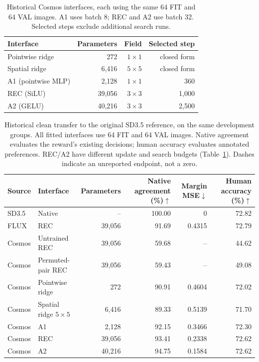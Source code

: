 \documentclass[10pt,twocolumn,letterpaper]{article}
\begin{document}
\begin{table}[t]
\centering\small
\begin{tabular}{lrrr}
\toprule
Interface & Parameters & Field & Selected step\\
\midrule
Pointwise ridge &272&$1\times1$&closed form\\
Spatial ridge &6,416&$5\times5$&closed form\\
A1 (pointwise MLP)&2,128&$1\times1$&360\\
REC (SiLU)&39,056&$3\times3$&1,000\\
A2 (GELU)&40,216&$3\times3$&2,500\\
\bottomrule
\end{tabular}
\caption{Historical Cosmos interfaces, each using the same 64 FIT and 64 VAL images. A1 uses batch 8; REC and A2 use batch 32. Selected steps exclude additional search runs.}
\label{tab:architectures}
\end{table}

\begin{table}[t]
\centering\small
\begin{tabular}{llrrrr}
\toprule
Source & Interface & Parameters & Native agreement (\%)$\uparrow$ & Margin MSE$\downarrow$ & Human accuracy (\%)$\uparrow$\\
\midrule
SD3.5 & Native &--&100.00&0&72.82\\
FLUX & REC &39,056&91.69&0.4315&72.79\\
Cosmos & Untrained REC &39,056&59.68&--&44.62\\
Cosmos & Permuted-pair REC &39,056&59.43&--&49.08\\
Cosmos & Pointwise ridge &272&90.91&0.4604&72.02\\
Cosmos & Spatial ridge $5\times5$ &6,416&89.33&0.5139&71.70\\
Cosmos & A1 &2,128&92.15&0.3466&72.30\\
Cosmos & REC &39,056&93.41&0.2338&72.62\\
Cosmos & A2 &40,216&94.75&0.1584&72.62\\
\bottomrule
\end{tabular}
\caption{Historical clean transfer to the original SD3.5 reference, on the same development groups. All fitted interfaces use 64 FIT and 64 VAL images. Native agreement evaluates the reward's existing decisions; human accuracy evaluates annotated preferences. REC/A2 have different update and search budgets (Table~\ref{tab:architectures}). Dashes indicate an unreported endpoint, not a zero.}
\label{tab:main}
\end{table}
\end{document}
